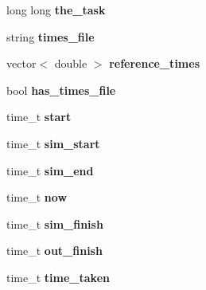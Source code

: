 \begin{DoxyCompactItemize}
\item 
long long {\bfseries the\+\_\+task}\hypertarget{class_tree_a9f74137d5c9c5529ec9a06f88dfa6960}{}\label{class_tree_a9f74137d5c9c5529ec9a06f88dfa6960}

\item 
string {\bfseries times\+\_\+file}\hypertarget{class_tree_a5e031ea8d94f48288547116a9e7d7add}{}\label{class_tree_a5e031ea8d94f48288547116a9e7d7add}

\item 
vector$<$ double $>$ {\bfseries reference\+\_\+times}\hypertarget{class_tree_a56bb1ea64368f5b705360a435350f9d5}{}\label{class_tree_a56bb1ea64368f5b705360a435350f9d5}

\item 
bool {\bfseries has\+\_\+times\+\_\+file}\hypertarget{class_tree_adf239a9aa029c9c6eda4b10c5ce20780}{}\label{class_tree_adf239a9aa029c9c6eda4b10c5ce20780}

\item 
time\+\_\+t {\bfseries start}\hypertarget{class_tree_ac077d686ee96b123aa779e8a8a5de3ce}{}\label{class_tree_ac077d686ee96b123aa779e8a8a5de3ce}

\item 
time\+\_\+t {\bfseries sim\+\_\+start}\hypertarget{class_tree_a01cc9b30f2b10b9f51b218df25b13b09}{}\label{class_tree_a01cc9b30f2b10b9f51b218df25b13b09}

\item 
time\+\_\+t {\bfseries sim\+\_\+end}\hypertarget{class_tree_a26100477c7e58a9e0a90cdee1379ed69}{}\label{class_tree_a26100477c7e58a9e0a90cdee1379ed69}

\item 
time\+\_\+t {\bfseries now}\hypertarget{class_tree_a5510d0fb5deb23fd39a2619d104f85fa}{}\label{class_tree_a5510d0fb5deb23fd39a2619d104f85fa}

\item 
time\+\_\+t {\bfseries sim\+\_\+finish}\hypertarget{class_tree_ac399ba59be9dc33a04223d10a82ee5ee}{}\label{class_tree_ac399ba59be9dc33a04223d10a82ee5ee}

\item 
time\+\_\+t {\bfseries out\+\_\+finish}\hypertarget{class_tree_a5ee1fa5adf72bb599badc041fbee7d09}{}\label{class_tree_a5ee1fa5adf72bb599badc041fbee7d09}

\item 
time\+\_\+t {\bfseries time\+\_\+taken}\hypertarget{class_tree_abd18bb487c0192588b6bed6f00bcfd07}{}\label{class_tree_abd18bb487c0192588b6bed6f00bcfd07}


\end{DoxyCompactItemize}
